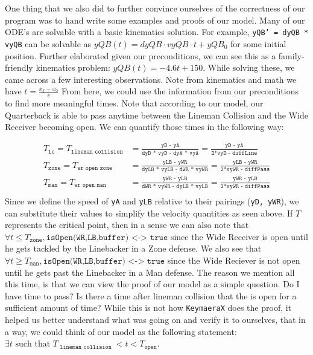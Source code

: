 \quad One thing that we also did to further convince ourselves of the correctness of our program was to hand write some examples and proofs of our model. Many of our ODE's are solvable with a basic kinematics solution. For example, \texttt{yQB' = dyQB * vyQB} can be solvable as $yQB(t) = dyQB \cdot vyQB \cdot t + yQB_0$ for some initial position. Further elaborated given our preconditions, we can see this as a family-friendly kinematics problem: $yQB(t) = -4.6t + 150$. While solving these, we came across a few interesting observations. Note from kinematics and math we have $t = \frac{x_f - x_0}{v}$ From here, we could use the information from our preconditions to find more meaningful times. Note that according to our model, our Quarterback is able to pass anytime between the Lineman Collision and the Wide Receiver becoming open. We can quantify those times in the following way:

\begin{align*}
    T_\texttt{lc} = T_\texttt{lineman collision} &= \frac{\texttt{yD - yA}}{\texttt{dyD * vyD - dyA * vyA}} = \frac{\texttt{yD - yA}}{\texttt{2*vyD - diffLine}} \\
    T_\texttt{zone} = T_\texttt{wr open zone} &= \frac{\texttt{yLB - yWR}}{\texttt{dyLB * vyLB - dWR * vyWR}} = \frac{\texttt{yLB - yWR}}{\texttt{2*vyWR - diffPass}} \\ 
    T_\texttt{man} = T_\texttt{wr open man} &= \frac{\texttt{yWR - yLB}}{\texttt{dWR * vyWR - dyLB * vyLB}} = \frac{\texttt{yWR - yLB}}{\texttt{2*vyWR - diffPass}} \\
\end{align*}
\quad Since we define the speed of \texttt{yA} and \texttt{yLB} relative to their pairings (\texttt{yD, yWR}), we can substitute their values to simplify the velocity quantities as seen above. If $T$ represents the critical point, then in a sense we can also note that $\forall t \le T_{\texttt{zone}}, \texttt{isOpen(WR,LB,buffer) <-> true}$ since the Wide Receiver is open until he gets tackled by the Linebacker in a Zone defense. We also see that $\forall t \ge T_{\texttt{man}}, \texttt{isOpen(WR,LB,buffer) <-> true}$ since the Wide Reciever is not open until he gets past the Linebacker in a Man defense. The reason we mention all this time, is that we can view the proof of our model as a simple question. Do I have time to pass? Is there a time after lineman collision that the  is open for a sufficient amount of time? While this is not how \texttt{KeymaeraX} does the proof, it helped us better understand what was going on and verify it to ourselves, that in a way, we could think of our model as the following statement: $\exists t \text{ such that } T_{\texttt{ lineman collision }} < t < T_{\texttt{open}}$. \\

